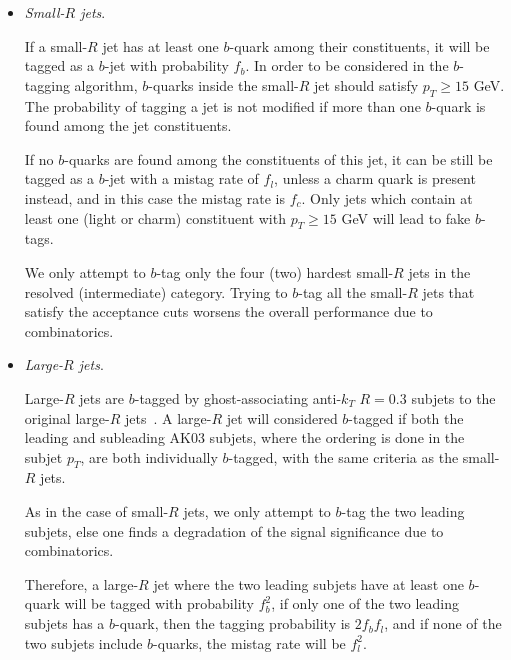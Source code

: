 \begin{itemize}

\item {\it Small-$R$ jets}.

  If a small-$R$ jet has at least one $b$-quark among their constituents,
  it will be tagged as a $b$-jet with probability $f_b$.
  In order to be considered in the $b$-tagging algorithm,
  $b$-quarks inside the small-$R$ jet
  should satisfy $p_T \ge 15$ GeV.
  The probability of tagging a jet is not modified
  if more than one $b$-quark is found among the jet constituents.


  
  If no $b$-quarks are found among the constituents
  of this jet, it can be still be tagged as a $b$-jet with
  a mistag rate of $f_l$, unless a charm quark is present instead,
  and in this case the mistag rate is $f_c$.
  Only jets which contain at least one (light or charm)
  constituent
  with $p_T \ge 15$ GeV will lead to fake $b$-tags.

  
  We only attempt to $b$-tag only the four (two) hardest small-$R$ jets
  in the resolved (intermediate) category.
  Trying to $b$-tag all the
  small-$R$ jets that satisfy the acceptance cuts worsens the
  overall performance
  due to combinatorics.

  \item {\it Large-$R$ jets}.

    Large-$R$ jets are $b$-tagged by
    ghost-associating anti-$k_T$ $R=0.3$
    subjets to the original large-$R$
    jets~\cite{Cacciari:2007fd,Aad:2013gja,
      ATLAS-CONF-2014-004,Aad:2015uka}.
    A large-$R$ jet will considered $b$-tagged if both
    the leading and subleading AK03 subjets, where the ordering
    is done in the subjet $p_T$, are both individually $b$-tagged,
    with the same criteria as the small-$R$ jets.

    
    As in the case
    of small-$R$ jets, we only attempt to $b$-tag the two leading subjets,
    else one finds a degradation of the
    signal significance due to combinatorics.

    Therefore, a large-$R$ jet where the two leading
    subjets have at least one $b$-quark will be tagged
    with probability $f_b^2$, if only one of the two leading
    subjets has a $b$-quark, then the tagging probability is
    $2f_bf_l$, and if none of the two subjets include $b$-quarks,
    the mistag rate will be $f_l^2$.


\end{itemize}

